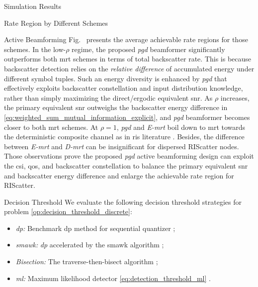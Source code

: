 \documentclass[journal]{IEEEtran}
\begin{document}
\begin{section}{Simulation Results}
\begin{subsection}{Rate Region by Different Schemes}
\begin{subsubsection}{Active Beamforming}
			Fig.~ presents the average achievable rate regions for those schemes.
			In the low-$\rho$ regime, the proposed \emph{\gls{pgd}} beamformer significantly outperforms both \gls{mrt} schemes in terms of total backscatter rate.
			This is because backscatter detection relies on the \emph{relative difference} of accumulated energy under different symbol tuples.
			Such an energy diversity is enhanced by \emph{\gls{pgd}} that effectively exploits backscatter constellation and input distribution knowledge, rather than simply maximizing the direct/ergodic equivalent \gls{snr}.
			As $\rho$ increases, the primary equivalent \gls{snr} outweighs the backscatter energy difference in \eqref{eq:weighted_sum_mutual_information_explicit}, and \emph{\gls{pgd}} beamformer becomes closer to both \gls{mrt} schemes.
			At $\rho=1$, \emph{\gls{pgd}} and \emph{E-\gls{mrt}} boil down to \gls{mrt} towards the deterministic composite channel as in \gls{ris} literature \cite{Wu2019}.
			Besides, the difference between \emph{E-\gls{mrt}} and \emph{D-\gls{mrt}} can be insignificant for dispersed RIScatter nodes.
			Those observations prove the proposed \emph{\gls{pgd}} active beamforming design can exploit the \gls{csi}, \gls{qos}, and backscatter constellation to balance the primary equivalent \gls{snr} and backscatter energy difference and enlarge the achievable rate region for RIScatter.
		\end{subsubsection}

		\begin{subsubsection}{Decision Threshold}
			We evaluate the following decision threshold strategies for problem \eqref{op:decision_threshold_discrete}:
			\begin{itemize}
				\item \emph{\gls{dp}:} Benchmark \gls{dp} method for sequential quantizer \cite{He2021};
				\item \emph{\gls{smawk}:} \emph{\gls{dp}} accelerated by the \gls{smawk} algorithm \cite{He2021};
				\item \emph{Bisection:} The traverse-then-bisect algorithm \cite{Nguyen2020a};
				\item \emph{\gls{ml}:} Maximum likelihood detector \eqref{eq:detection_threshold_ml} \cite{Qian2019}.
			\end{itemize}


\end{subsubsection}
\end{subsection}
\end{section}
\end{document}

